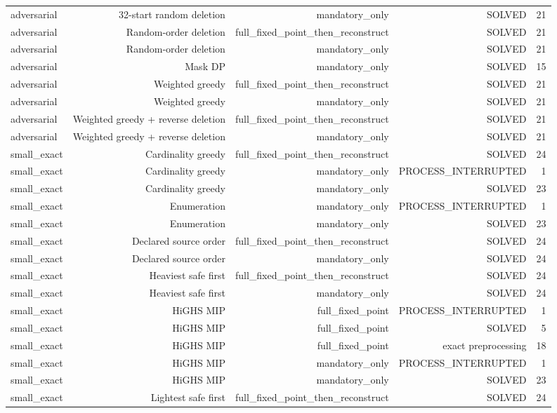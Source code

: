 {\begin{longtable}{lrrrr}
adversarial & 32-start random deletion & mandatory\_only & SOLVED & 21 \\
adversarial & Random-order deletion & full\_fixed\_point\_then\_reconstruct & SOLVED & 21 \\
adversarial & Random-order deletion & mandatory\_only & SOLVED & 21 \\
adversarial & Mask DP & mandatory\_only & SOLVED & 15 \\
adversarial & Weighted greedy & full\_fixed\_point\_then\_reconstruct & SOLVED & 21 \\
adversarial & Weighted greedy & mandatory\_only & SOLVED & 21 \\
adversarial & Weighted greedy + reverse deletion & full\_fixed\_point\_then\_reconstruct & SOLVED & 21 \\
adversarial & Weighted greedy + reverse deletion & mandatory\_only & SOLVED & 21 \\
small\_exact & Cardinality greedy & full\_fixed\_point\_then\_reconstruct & SOLVED & 24 \\
small\_exact & Cardinality greedy & mandatory\_only & PROCESS\_INTERRUPTED & 1 \\
small\_exact & Cardinality greedy & mandatory\_only & SOLVED & 23 \\
small\_exact & Enumeration & mandatory\_only & PROCESS\_INTERRUPTED & 1 \\
small\_exact & Enumeration & mandatory\_only & SOLVED & 23 \\
small\_exact & Declared source order & full\_fixed\_point\_then\_reconstruct & SOLVED & 24 \\
small\_exact & Declared source order & mandatory\_only & SOLVED & 24 \\
small\_exact & Heaviest safe first & full\_fixed\_point\_then\_reconstruct & SOLVED & 24 \\
small\_exact & Heaviest safe first & mandatory\_only & SOLVED & 24 \\
small\_exact & HiGHS MIP & full\_fixed\_point & PROCESS\_INTERRUPTED & 1 \\
small\_exact & HiGHS MIP & full\_fixed\_point & SOLVED & 5 \\
small\_exact & HiGHS MIP & full\_fixed\_point & exact preprocessing & 18 \\
small\_exact & HiGHS MIP & mandatory\_only & PROCESS\_INTERRUPTED & 1 \\
small\_exact & HiGHS MIP & mandatory\_only & SOLVED & 23 \\
small\_exact & Lightest safe first & full\_fixed\_point\_then\_reconstruct & SOLVED & 24 \\

\end{longtable}}
